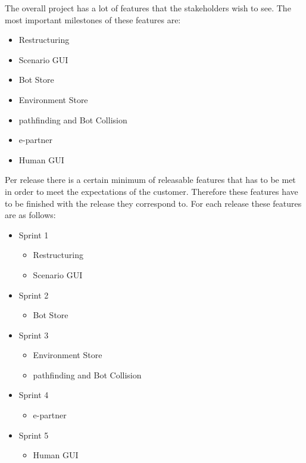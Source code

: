 \begin{description}
\item{}
The overall project has a lot of features that the stakeholders wish to see. The most important milestones of these features are:
\begin{itemize}
	\item Restructuring
	\item Scenario GUI
	\item Bot Store
	\item Environment Store
	\item \gls{pathfinding} and Bot Collision
	\item \gls{e-partner}
	\item Human GUI
\end{itemize}

Per release there is a certain minimum of releasable features that has to be met in order to meet the expectations of the customer. Therefore these features have to be finished with the release they correspond to. For each release these features are as follows:
\begin{itemize}
	\item Sprint 1
	\begin{itemize}
		\item Restructuring
		\item Scenario GUI
	\end{itemize}
	\item Sprint 2
	\begin{itemize}
		\item Bot Store
	\end{itemize}
	\item Sprint 3
	\begin{itemize}
		\item Environment Store
		\item \gls{pathfinding} and Bot Collision
	\end{itemize}
	\item Sprint 4
	\begin{itemize}
		\item \gls{e-partner}
	\end{itemize}
	\item Sprint 5
	\begin{itemize}
		\item Human GUI
	\end{itemize}
\end{itemize}


\end{description}
